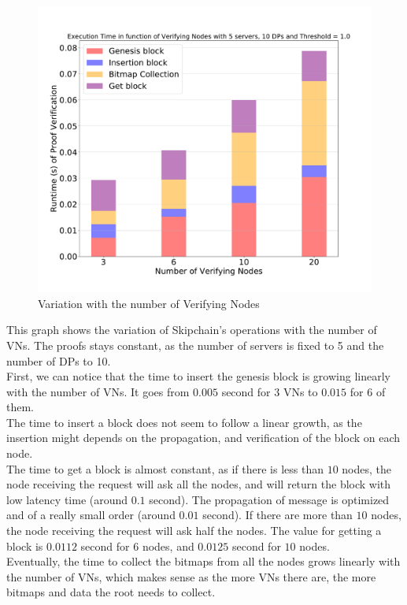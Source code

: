 \documentclass{article}
\begin{document}
\begin{figure}[H]
\includegraphics[scale=0.5]{variationVN}
\caption{Variation with the number of Verifying Nodes}
\end{figure}


This  graph shows the variation of Skipchain's operations with the number of VNs. The proofs stays constant, as the number of servers is fixed to 5 and the number of DPs to 10.\\
First, we can notice that the time to insert the genesis block is growing linearly with the number of VNs. It goes from $0.005$ second for $3$ VNs to $0.015$ for $6$ of them.\\
The time to insert a block does not seem to follow a linear growth, as the insertion might depends on the propagation, and verification of the block on each node.\\
The time to get a block is almost constant, as if there is less than $10$ nodes, the node receiving the request will ask all the nodes, and will return the block with low latency time (around $0.1$ second). The propagation of message is optimized and of a really small order (around $0.01$ second). If there are more than $10$ nodes, the node receiving the request will ask half the nodes. The value for getting a block is $0.0112$ second for $6$ nodes, and $0.0125$ second for $10$ nodes.\\
Eventually, the time to collect the bitmaps from all the nodes grows linearly with the number of VNs, which makes sense as the more VNs there are, the more bitmaps and data the root needs to collect.
\end{document}
